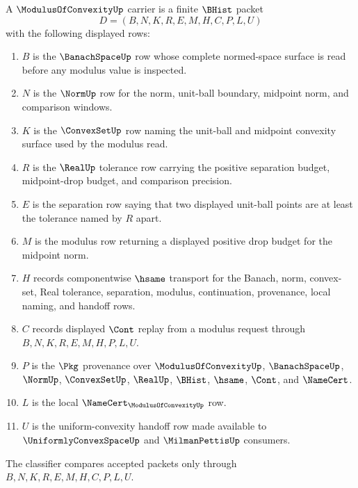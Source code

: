 \begin{definition}
\label{def:modulus-of-convexity-carrier}
A $\ModulusOfConvexityUp$ carrier is a finite $\BHist$ packet
$$
D=(B,N,K,R,E,M,H,C,P,L,U)
$$
with the following displayed rows:
\begin{enumerate}
\item $B$ is the $\BanachSpaceUp$ row whose complete normed-space surface is read before any modulus value is inspected.
\item $N$ is the $\NormUp$ row for the norm, unit-ball boundary, midpoint norm, and comparison windows.
\item $K$ is the $\ConvexSetUp$ row naming the unit-ball and midpoint convexity surface used by the modulus read.
\item $R$ is the $\RealUp$ tolerance row carrying the positive separation budget, midpoint-drop budget, and comparison precision.
\item $E$ is the separation row saying that two displayed unit-ball points are at least the tolerance named by $R$ apart.
\item $M$ is the modulus row returning a displayed positive drop budget for the midpoint norm.
\item $H$ records componentwise $\hsame$ transport for the Banach, norm, convex-set, Real tolerance, separation, modulus, continuation, provenance, local naming, and handoff rows.
\item $C$ records displayed $\Cont$ replay from a modulus request through $B,N,K,R,E,M,H,P,L,U$.
\item $P$ is the $\Pkg$ provenance over $\ModulusOfConvexityUp$, $\BanachSpaceUp$, $\NormUp$, $\ConvexSetUp$, $\RealUp$, $\BHist$, $\hsame$, $\Cont$, and $\NameCert$.
\item $L$ is the local $\NameCert_{\ModulusOfConvexityUp}$ row.
\item $U$ is the uniform-convexity handoff row made available to $\UniformlyConvexSpaceUp$ and $\MilmanPettisUp$ consumers.
\end{enumerate}
The classifier compares accepted packets only through $B,N,K,R,E,M,H,C,P,L,U$.
\end{definition}


